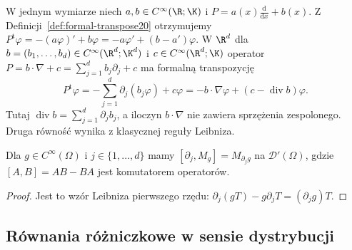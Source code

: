 \begin{przyklad}
\label{ex:first-order-P20}
W jednym wymiarze niech $a,b\in C^\infty(\R;\K)$
i $P=a(x)\frac{\mathrm d}{\mathrm dx}+b(x)$.
Z Definicji~\ref{def:formal-transpose20} otrzymujemy
$P^{\mathrm t}\varphi=-(a\varphi)'+b\varphi
=-a\varphi'+(b-a')\varphi$.
W $\R^d$ dla $b=(b_1,\ldots,b_d)\in C^\infty(\R^d;\K^d)$
i $c\in C^\infty(\R^d;\K)$ operator
$P=b\cdot\nabla+c=\sum_{j=1}^d b_j\partial_j+c$
ma formalną transpozycję
\[
P^{\mathrm t}\varphi=-\sum_{j=1}^d\partial_j(b_j\varphi)
+c\varphi=-b\cdot\nabla\varphi+(c-\operatorname{div}b)\varphi.
\]
Tutaj $\operatorname{div}b=\sum_{j=1}^d\partial_j b_j$,
a iloczyn $b\cdot\nabla$ nie zawiera sprzężenia zespolonego.
Druga równość wynika z klasycznej reguły Leibniza.
\end{przyklad}

\begin{wniosek}
\label{cor:commutator20}
Dla $g\in C^\infty(\Omega)$ i $j\in\{1,\ldots,d\}$ mamy
$[\partial_j,M_g]=M_{\partial_jg}$ na $\mathcal D'(\Omega)$,
gdzie $[A,B]=AB-BA$ jest komutatorem operatorów.
\end{wniosek}
\begin{proof}
Jest to wzór Leibniza pierwszego rzędu:
$\partial_j(gT)-g\partial_jT=(\partial_jg)T$.
\end{proof}

\subsection{Równania różniczkowe w sensie dystrybucji}

